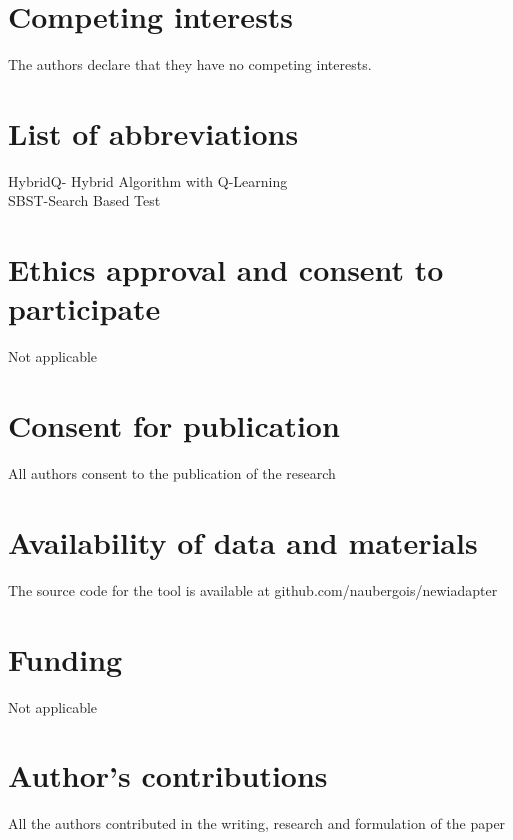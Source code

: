 \documentclass{bmcart}
\begin{document}

\begin{backmatter}

\section*{Competing interests}
  The authors declare that they have no competing interests.
  
\section*{List of abbreviations}
HybridQ- Hybrid Algorithm with Q-Learning \\
SBST-Search Based Test

\section*{Ethics approval and consent to participate}
Not applicable

\section*{Consent for publication}
All authors consent to the publication of the research

\section*{Availability of data and materials}
The source code for the tool is available at github.com/naubergois/newiadapter

\section*{Funding}
Not applicable

\section*{Author's contributions}
All the authors contributed in the writing, research and formulation of the paper


\end{backmatter}
\end{document}
